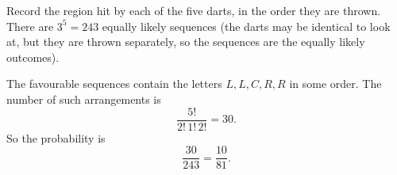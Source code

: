 Record the region hit by each of the five darts, in the order they are thrown. There are $3^5=243$ equally likely sequences (the darts may be identical to look at, but they are thrown separately, so the sequences are the equally likely outcomes).

The favourable sequences contain the letters $L,L,C,R,R$ in some order. The number of such arrangements is
\[
\dfrac{5!}{2!\,1!\,2!}=30 .
\]
So the probability is
\[
\dfrac{30}{243}=\boxed{\dfrac{10}{81}}.
\]
